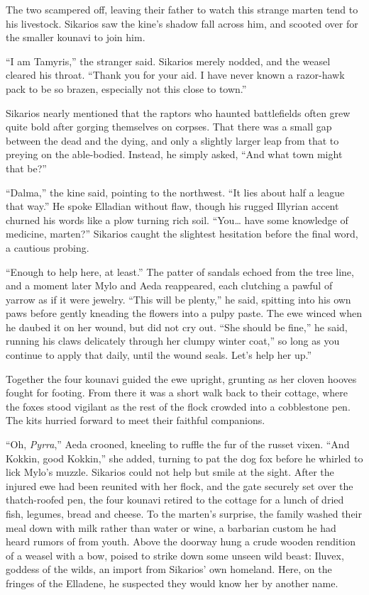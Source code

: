 The two scampered off, leaving their father to watch this strange marten tend to his livestock. Sikarios saw the kine's shadow fall across him, and scooted over for the smaller kounavi to join him.

``I am Tamyris,'' the stranger said. Sikarios merely nodded, and the weasel cleared his throat. ``Thank you for your aid. I have never known a razor-hawk pack to be so brazen, especially not this close to town.''

Sikarios nearly mentioned that the raptors who haunted battlefields often grew quite bold after gorging themselves on corpses. That there was a small gap between the dead and the dying, and only a slightly larger leap from that to preying on the able-bodied. Instead, he simply asked, ``And what town might that be?''

``Dalma,'' the kine said, pointing to the northwest. ``It lies about half a league that way.'' He spoke Elladian without flaw, though his rugged Illyrian accent churned his words like a plow turning rich soil. ``You\ldots{} have some knowledge of medicine, marten?'' Sikarios caught the slightest hesitation before the final word, a cautious probing.

``Enough to help here, at least.'' The patter of sandals echoed from the tree line, and a moment later Mylo and Aeda reappeared, each clutching a pawful of yarrow as if it were jewelry. ``This will be plenty,'' he said, spitting into his own paws before gently kneading the flowers into a pulpy paste. The ewe winced when he daubed it on her wound, but did not cry out. ``She should be fine,'' he said, running his claws delicately through her clumpy winter coat,'' so long as you continue to apply that daily, until the wound seals. Let's help her up.''

Together the four kounavi guided the ewe upright, grunting as her cloven hooves fought for footing. From there it was a short walk back to their cottage, where the foxes stood vigilant as the rest of the flock crowded into a cobblestone pen. The kits hurried forward to meet their faithful companions.

``Oh, \emph{Pyrra},'' Aeda crooned, kneeling to ruffle the fur of the russet vixen. ``And Kokkin, good Kokkin,'' she added, turning to pat the dog fox before he whirled to lick Mylo's muzzle. Sikarios could not help but smile at the sight. After the injured ewe had been reunited with her flock, and the gate securely set over the thatch-roofed pen, the four kounavi retired to the cottage for a lunch of dried fish, legumes, bread and cheese. To the marten's surprise, the family washed their meal down with milk rather than water or wine, a barbarian custom he had heard rumors of from youth. Above the doorway hung a crude wooden rendition of a weasel with a bow, poised to strike down some unseen wild beast: Iluvex, goddess of the wilds, an import from Sikarios' own homeland. Here, on the fringes of the Elladene, he suspected they would know her by another name.

